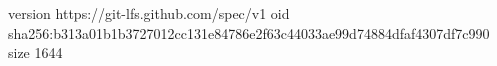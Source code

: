 version https://git-lfs.github.com/spec/v1
oid sha256:b313a01b1b3727012cc131e84786e2f63c44033ae99d74884dfaf4307df7c990
size 1644
